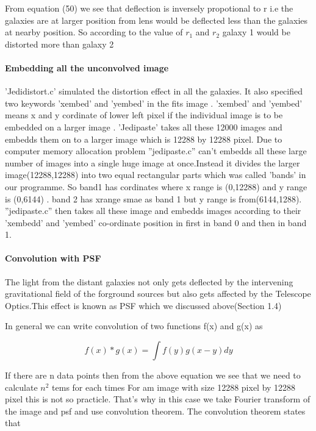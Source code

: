 From equation (50) we see that deflection is inversely propotional to r i.e the galaxies are at larger position from lens
would be deflected less than the galaxies at nearby position. So according to the value of $ r_1 $ and $ r_2$ galaxy 1 would be distorted more than galaxy 2


\paragraph{Embedding all the unconvolved image}

 'Jedidistort.c' simulated the distortion effect in all the galaxies. It also specified two keywords 'xembed' and 'yembed' in the
fits image . 'xembed' and 'yembed' means x and y cordinate of lower left pixel if the individual image is to be embedded on a larger
image . 'Jedipaste' takes all these 12000 images and embedds them on to a larger image which is 12288 by 12288 pixel.
Due to computer memory allocation problem ''jedipaste.c'' can't embedds all these large number of images into a single huge image
at once.Instead it divides the larger image(12288,12288) into two equal rectangular parts which was called 'bands' in our programme.
So band1 has cordinates where x range is (0,12288) and y range is (0,6144) . band 2 has xrange smae as band 1 but y range is from(6144,1288).
''jedipaste.c'' then takes all these image and embedds images according to their 'xembedd' and 'yembed' co-ordinate position in
first in band 0 and then in band 1.


\paragraph{Convolution with PSF}

The light from the distant galaxies not only gets deflected by the intervening gravitational field of the forground sources but also
gets affected by the Telescope Optics.This effect is known as PSF which we discussed above(Section 1.4)

In general we can write convolution of two functions f(x) and g(x) as


\begin{equation}
 f(x)*g(x) = \int f(y)g(x-y)dy
\end{equation}

If there are n data points then from the above equation we see that we need to calculate $ n^2$ tems for each times
For am image with size 12288 pixel by 12288 pixel this is not so practicle. That's why in this case we take Fourier transform of the image and psf and use convolution theorem.
The convolution theorem states that

